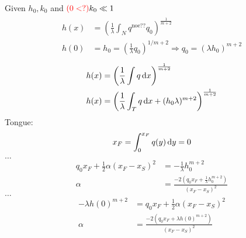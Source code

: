 %
Given $h_0, k_0$ and $ \textcolor{red}{(0 <?) }k_0 \ll 1$
%
\begin{align*}
    \begin{split}
        h(x) &= \left(\frac{1}{\lambda} \int_N q^{\text{noe??}} q_0 \right)^{\frac{1}{m+2}} \\
        h(0) &= h_0 = \left(\frac{1}{\lambda}q_0\right)^{1/m+2} \Rightarrow q_0 = (\lambda h_0 )^{m+2}
    \end{split}
\end{align*}
%
%
\begin{align*}
    \begin{split}
        h(x) &= \left(\frac{1}{\lambda} \int q \dif{x} \right)^{\frac{1}{m+2}} \\
        h(x) &= \left(\frac{1}{\lambda} \int_T q \dif{x} + (h_0 \lambda)^{m+2} \right)^{\frac{1}{m+2}}
    \end{split}
\end{align*}
%
Tongue:
\begin{align*}
    x_F = \int_0^{x_F} q(y) \dif{y} = 0 \\
\end{align*}
%
$\dots$
%
\begin{align*}
    q_0 x_F + \frac{1}{2} \alpha (x_F - x_S)^2 &= -\frac{1}{\lambda} h_0^{m+2} \\
    \alpha &= \frac{-2 \left(q_0 x_F + \frac{1}{\lambda} h_0^{m+2}\right)}{(x_F - x_S)^2}
\end{align*}
%
$\dots$
%
\begin{align*}
      -\lambda h(0)^{m+2}&= q_0 x_F + \frac{1}{2} \alpha (x_F - x_S)^2  \\
    \alpha &= \frac{-2 \left(q_0 x_F + \lambda h(0)^{m+2}\right)}{(x_F - x_S)^2}
\end{align*}
